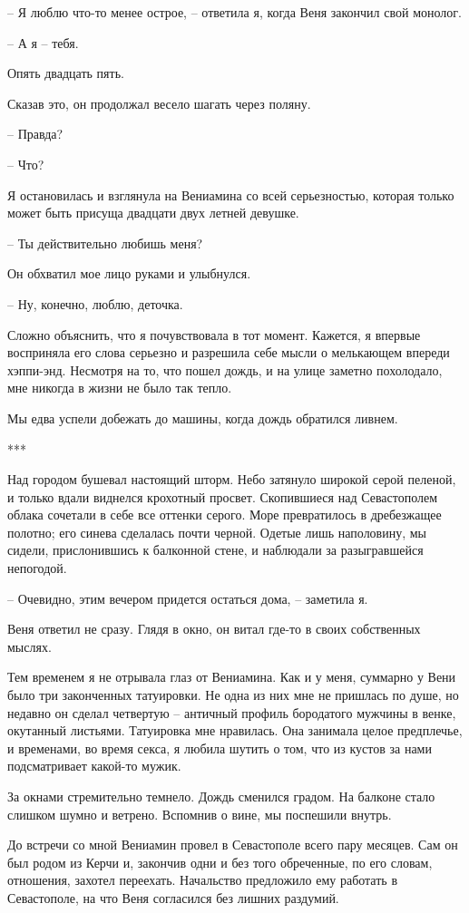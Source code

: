 \documentclass[
]{book}
\begin{document}
-- Я люблю что-то менее острое, -- ответила я, когда Веня закончил свой монолог.

-- А я -- тебя.

Опять двадцать пять.

Сказав это, он продолжал весело шагать через поляну.

-- Правда?

-- Что?

Я остановилась и взглянула на Вениамина со всей серьезностью, которая только может быть присуща двадцати двух летней девушке.

-- Ты действительно любишь меня?

Он обхватил мое лицо руками и улыбнулся.

-- Ну, конечно, люблю, деточка.

Сложно объяснить, что я почувствовала в тот момент. Кажется, я впервые восприняла его слова серьезно и разрешила себе мысли о мелькающем впереди хэппи-энд. Несмотря на то, что пошел дождь, и на улице заметно похолодало, мне никогда в жизни не было так тепло.

Мы едва успели добежать до машины, когда дождь обратился ливнем.

***

Над городом бушевал настоящий шторм. Небо затянуло широкой серой пеленой, и только вдали виднелся крохотный просвет. Скопившиеся над Севастополем облака сочетали в себе все оттенки серого. Море превратилось в дребезжащее полотно; его синева сделалась почти черной. Одетые лишь наполовину, мы сидели, прислонившись к балконной стене, и наблюдали за разыгравшейся непогодой.

-- Очевидно, этим вечером придется остаться дома, -- заметила я.

Веня ответил не сразу. Глядя в окно, он витал где-то в своих собственных мыслях.

Тем временем я не отрывала глаз от Вениамина. Как и у меня, суммарно у Вени было три законченных татуировки. Не одна из них мне не пришлась по душе, но недавно он сделал четвертую -- античный профиль бородатого мужчины в венке, окутанный листьями. Татуировка мне нравилась. Она занимала целое предплечье, и временами, во время секса, я любила шутить о том, что из кустов за нами подсматривает какой-то мужик.

За окнами стремительно темнело. Дождь сменился градом. На балконе стало слишком шумно и ветрено. Вспомнив о вине, мы поспешили внутрь.

До встречи со мной Вениамин провел в Севастополе всего пару месяцев. Сам он был родом из Керчи и, закончив одни и без того обреченные, по его словам, отношения, захотел переехать. Начальство предложило ему работать в Севастополе, на что Веня согласился без лишних раздумий.
\end{document}
